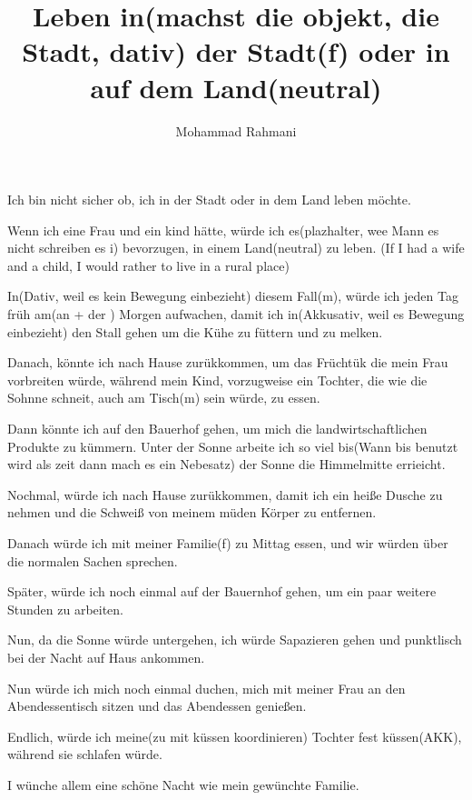 \documentclass[a4paper]{article}
\title{Leben in(machst die objekt, die Stadt, dativ) der Stadt(f) oder in auf dem Land(neutral)}
\date{}
\author{Mohammad Rahmani}
\begin{document}
\maketitle
    Ich bin nicht sicher ob, ich in der Stadt oder in dem Land leben möchte.
    
    Wenn ich eine Frau und ein kind hätte, würde ich es(plazhalter, wee Mann es nicht schreiben es i) bevorzugen, in einem Land(neutral) zu leben. (If I had a wife and a child, I would rather to live in a rural place)

    In(Dativ, weil es kein Bewegung einbezieht) diesem Fall(m), würde ich jeden Tag früh am(an + der ) Morgen  aufwachen, damit ich in(Akkusativ, weil es Bewegung einbezieht) den Stall gehen um die Kühe zu füttern und zu melken.
    
    Danach, könnte ich nach Hause zurükkommen, um das Früchtük die mein Frau vorbreiten würde, während mein Kind, vorzugweise ein Tochter, die wie die Sohnne schneit, auch am Tisch(m) sein würde, zu essen.

    Dann könnte ich auf den Bauerhof gehen, um mich die landwirtschaftlichen Produkte zu kümmern. Unter der Sonne arbeite ich so viel bis(Wann bis benutzt wird als zeit dann mach es ein Nebesatz) der Sonne die Himmelmitte errieicht.
    
    Nochmal, würde ich nach Hause zurükkommen, damit ich ein heiße Dusche zu nehmen und die Schweiß von meinem müden Körper zu entfernen.

    Danach würde ich mit meiner Familie(f) zu Mittag essen, und wir würden über die normalen Sachen sprechen.

    Später, würde ich noch einmal auf der Bauernhof gehen, um ein paar weitere Stunden zu arbeiten.

    Nun, da die Sonne würde untergehen, ich würde Sapazieren gehen und punktlisch bei der Nacht auf Haus ankommen.

    Nun würde ich mich noch einmal duchen, mich mit meiner Frau an den Abendessentisch sitzen und das Abendessen genießen.

    Endlich, würde ich meine(zu mit küssen koordinieren) Tochter fest küssen(AKK), während sie schlafen würde.

    I wünche allem eine schöne Nacht wie mein gewünchte Familie.

    

    
    
\end{document}
